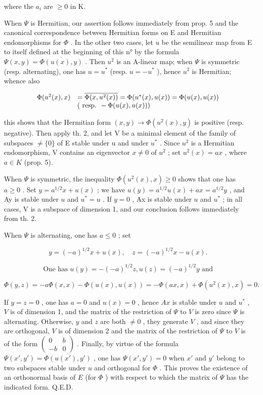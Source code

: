 where the \(a_{i}\) are \(\geqslant 0\) in K.

When \(\Psi\) is Hermitian, our assertion follows immediately from prop. 5 and the canonical correspondence between Hermitian forms on E and Hermitian endomorphisms for \(\Phi\) . In the other two cases, let \(u\) be the semilinear map from E to itself defined at the beginning of this n° by the formula \(\Psi(x, y) = \overline{\Phi(u(x), y)}\) . Then \(u^2\) is an A-linear map; when \(\Psi\) is symmetric (resp. alternating), one has \(u = u^*\) (resp. \(u = -u^*\) ), hence \(u^2\) is Hermitian; whence also

\[
\begin{array}{r l} \Phi (u ^ {2} (x), x) & = \overline {{\Phi (x , u ^ {2} (x))}} = \Phi (u ^ {*} (x), u (x)) = \Phi (u (x), u (x)) \\ & (\text { resp. } - \Phi (u (x), u (x))) \end{array}
\]

this shows that the Hermitian form \((x, y) \to \Phi(u^{2}(x), y)\) is positive (resp. negative). Then apply th. 2, and let V be a minimal element of the family of subspaces \(\neq\{0\}\) of E stable under u and under \(u^{*}\) . Since \(u^{2}\) is a Hermitian endomorphism, V contains an eigenvector \(x \neq 0\) of \(u^{2}\) ; set \(u^{2}(x) = ax\) , where \(a \in K\) (prop. 5).

When \(\Psi\) is symmetric, the inequality \(\Phi(u^{2}(x), x) \geqslant 0\) shows that one has \(a \geqslant 0\) . Set \(y = a^{1/2}x + u(x)\) ; we have \(u(y) = a^{1/2}u(x) + ax = a^{1/2}y\) , and Ay is stable under \(u\) and \(u^{*} = u\) . If \(y = 0\) , Ax is stable under \(u\) and \(u^{*}\) ; in all cases, V is a subspace of dimension 1, and our conclusion follows immediately from th. 2.

When \(\Psi\) is alternating, one has \(a \leqslant 0\) ; set

\[
y = (- a) ^ {1 / 2} x + u (x), \quad z = (- a) ^ {1 / 2} x - u (x).
\]

\[
\text { One has } u (y) = - (- a) ^ {1 / 2} z, u (z) = (- a) ^ {1 / 2} y \text { and }
\]

\[
\Phi (y, z) = - a \Phi (x, x) - \Phi (u (x), u (x)) = - \Phi (a x, x) + \Phi (u ^ {2} (x), x) = 0.
\]

If \(y = z = 0\) , one has \(a = 0\) and \(u(x) = 0\) , hence \(Ax\) is stable under \(u\) and \(u^{*}\) , \(V\) is of dimension 1, and the matrix of the restriction of \(\Psi\) to \(V\) is zero since \(\Psi\) is alternating. Otherwise, \(y\) and \(z\) are both \(\neq 0\) , they generate \(V\) , and since they are orthogonal, \(V\) is of dimension 2 and the matrix of the restriction of \(\Psi\) to \(V\) is of the form \(\begin{pmatrix} 0 & b \\ -b & 0 \end{pmatrix}\) . Finally, by virtue of the formula \(\Psi(x', y') = \overline{\Phi(u(x'), y')}\) , one has \(\Psi(x', y') = 0\) when \(x'\) and \(y'\) belong to two subspaces stable under \(u\) and orthogonal for \(\Phi\) . This proves the existence of an orthonormal basis of \(E\) (for \(\Phi\) ) with respect to which the matrix of \(\Psi\) has the indicated form. Q.E.D.


